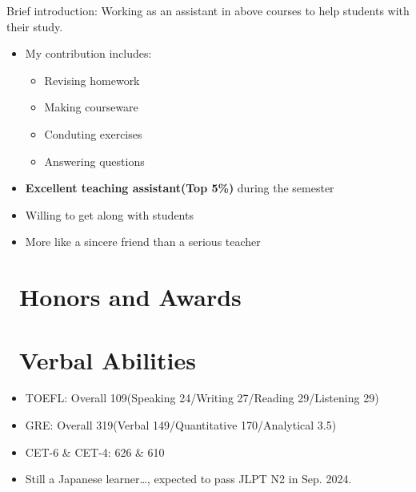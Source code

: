 \documentclass{resume}
\begin{document}
Brief introduction: Working as an assistant in above courses to help students with their study.
\begin{itemize}
  \item My contribution includes: 
\begin{itemize}
  \item  Revising homework 
  \item  Making courseware
  \item  Conduting exercises 
  \item  Answering questions
\end{itemize} 
  \item \textbf{Excellent teaching assistant(Top 5\%)} during the semester
  \item Willing to get along with students
  \item More like a sincere friend than a serious teacher
\end{itemize}



\section{\faHeartO\ Honors and Awards}

\section{\faInfo\ Verbal Abilities}
\begin{itemize}[parsep=0.5ex]
  \item TOEFL: Overall 109(Speaking 24/Writing 27/Reading 29/Listening 29)
  \item GRE: Overall 319(Verbal 149/Quantitative 170/Analytical 3.5)
  \item CET-6 \& CET-4: 626 \& 610
  \item Still a Japanese learner\dots, expected to pass JLPT N2 in Sep. 2024.
\end{itemize}

%
%
\end{document}

